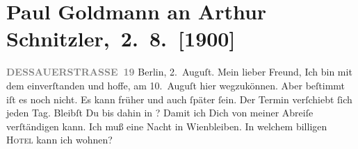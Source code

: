

         
         \renewcommand{\erwaehntePersonen}{Personen: Paul Goldmann, Alfred Kerr}
         \renewcommand{\erwaehnteOrte}{Orte: Bad Ischl, Berlin, Dessauer Straße, Toblach, Wien}
         \renewcommand{\erwaehnteWerke}{}
               \section[ Paul Goldmann an Arthur Schnitzler, 2. 8. {[}1900{]}]{ Paul Goldmann an Arthur Schnitzler, 2. 8. {[}1900{]}}\nopagebreak{}\rehead{ }\begin{ledgroupsized}[t]{13cm}\normalsize\beginnumbering{} \toendnotes[C]{\smallbreak\pagebreak[2]} 
\toendnotes[C]{\smallbreak}\pstart
           \noindent{}\raggedleft{}{\pb}\textcolor{gray}{\textbf{DESSAUERSTRASSE 19}}\pend
           \pstart
           Berlin, 2. Auguſt.\pend
           \pstart\center{}Mein lieber Freund,\pend\pstart
           Ich bin mit dem \label{K_L02926-1v}\label{K_L02926-1h} einverſtanden und hoffe, am 10. Auguſt hier
               wegzukönnen. Aber beſtimmt iſt es noch nicht.  Es
               kann früher und auch ſpäter ſein. Der Termin verſchiebt ſich jeden Tag. Bleibſt Du
               bis dahin in \label{K_L02926-2v}\label{K_L02926-2h}? Damit ich Dich von meiner
               Abreiſe verſtändigen kann.\pend
           \pstart
           Ich muß eine Nacht in Wienbleiben. In welchem billigen \textsc{Hotel} kann ich wohnen?\pend

\end{ledgroupsized}
